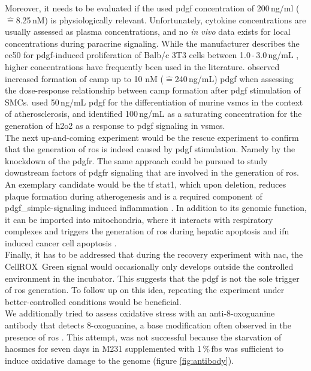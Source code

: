 Moreover, it needs to be evaluated if the used \ac{pdgf} concentration of 200\,ng/ml ($\widehat{=}$8.25\,nM) is physiologically relevant. Unfortunately, cytokine concentrations are usually assessed as plasma concentrations, and no \textit{in vivo} data exists for local concentrations during paracrine signaling. While the manufacturer describes the \ac{ec50} for \ac{pdgf}-induced proliferation of Balb/c 3T3 cells between 1.0\,-\,3.0\,ng/mL \cite{peprotecheclimitedRecombinantHumanPDGFBB2022}, higher concentrations have frequently been used in the literature. \textcite{gravesPlateletderivedGrowthFactor1996a} observed increased formation of \ac{camp} up to 10 nM ($\widehat{=}$240\,ng/mL) \ac{pdgf} when assessing the dose-response relationship between \ac{camp} formation after \ac{pdgf} stimulation of SMCs. \textcite{newmanMultipleCellTypes2021a} used 50\,ng/mL \ac{pdgf} for the differentiation of murine \acp{vsmc} in the context of atherosclerosis, and \textcite{bouziguesRegulationROSResponse2014a} identified 100\,ng/mL as a saturating concentration for the generation of \ac{h2o2} as a response to \ac{pdgf} signaling in \acp{vsmc}.\\
The next up-and-coming experiment would be the rescue experiment to confirm that the generation of \ac{ros} is indeed caused by \ac{pdgf} stimulation. Namely by the knockdown of the \ac{pdgfr}\beta. The same approach could be pursued to study downstream factors of \ac{pdgfr} signaling that are involved in the generation of \ac{ros}. An exemplary candidate would be the \ac{tf} \ac{stat1}, which upon deletion, reduces plaque formation during atherogenesis and is a required component of \ac{pdgf_simple}-signaling induced inflammation \cite{hePDGFRbetaSignallingRegulates2015}. In addition to its genomic function, it can be imported into mitochondria, where it interacts with respiratory complexes and triggers the generation of \ac{ros} \cite{wangSTATROSCycleExtends2018} during hepatic apoptosis \cite{leeRoleSTAT1IRF12007} and \ac{ifn} induced cancer cell apoptosis \cite{wangSTATROSCycleExtends2018}.\\
Finally, it has to be addressed that during the recovery experiment with \ac{nac}, the CellROX\texttrademark~Green signal would occasionally only develops outside the controlled environment in the incubator. This suggests that the \ac{pdgf} is not the sole trigger of \ac{ros} generation. To follow up on this idea, repeating the experiment under better-controlled conditions would be beneficial.\\
We additionally tried to assess oxidative stress with an anti-8-oxoguanine antibody that detects 8-oxoguanine, a base modification often observed in the presence of \ac{ros} \cite{leon8OxoguanineAccumulationMitochondrial2016}. This attempt, was not successful because the starvation of \acp{haosmc} for seven days in M231 supplemented with 1\,\%\,\ac{fbs} was sufficient to induce oxidative damage to the genome (figure \ref{fig:antibody}).


